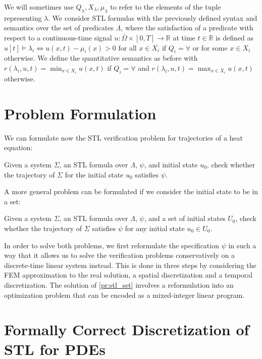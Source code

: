 \documentclass[oribibl]{llncs/llncs}
\newcommand*{\R}{\mathbb{R}}
\begin{document}
We will sometimes use $Q_\lambda, X_\lambda, \mu_\lambda$ to refer to the
elements of the tuple representing $\lambda$. We consider STL formulas 
with the previously defined syntax and semantics 
over the set of predicates $\Lambda$, where the satisfaction of a
predicate with respect to a continuous-time signal $u : \bar\Omega \times [0, T]
\to \R$ at time $t \in \R$ is defined as $u[t] \models \lambda_i \iff 
u(x, t) - \mu_i(x) > 0$ for all $x \in X_i$ if $Q_i = \forall$ or for some $x \in
X_i$ otherwise. We define the quantitative semantics as before with
$r(\lambda_i,u, t) = \min_{x \in X_i} u(x, t)$ if $Q_i = \forall$ and
$r(\lambda_i,u, t) = \max_{x \in X_i} u(x, t)$ otherwise.

\section{Problem Formulation}
\label{sec:problem_formulation}

We can formulate now the STL verification problem for trajectories of a heat
equation:

\begin{problem}
\label{pr:stl}
    Given a system $\Sigma$, an STL formula over $\Lambda$, $\psi$, and initial state $u_0$,
    check whether the trajectory of $\Sigma$ for the initial state $u_0$
    satisfies $\psi$.
\end{problem}

A more general problem can be formulated if we consider the initial state to be
in a set:

\begin{problem}
\label{pr:stl_set}
    Given a system $\Sigma$, an STL formula over $\Lambda$, $\psi$, and a set of initial states
    $U_0$, check whether the trajectory of $\Sigma$ satisfies $\psi$ 
    for any initial state $u_0 \in U_0$.
\end{problem}

In order to solve both problems, we first reformulate the specification $\psi$
in such a way that it allows us to solve the verification problems
conservatively on a discrete-time linear system instead. This is done in three
steps by considering the FEM approximation to the real solution, a spatial
discretization and a temporal discretization. The solution of \cref{pr:stl_set}
involves a reformulation into an optimization problem that can be encoded as a
mixed-integer linear program.

\section{Formally Correct Discretization of STL for PDEs}
\label{sec:formally_correct_discretization_of_pdestl}
\end{document}

